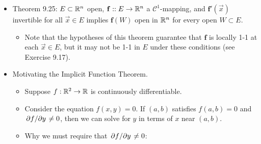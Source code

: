 \documentclass[../notes.tex]{subfiles}
\begin{document}
\begin{itemize}
\begin{enumerate}[label={(\alph*)}]
\begin{proof}
\begin{equation*}
                \frac{|\mathbf{g}(\vec{y}+\vec{k})-\mathbf{g}(\vec{y})-T\vec{k}|}{|\vec{k}|} \leq \frac{\norm{T}|\mathbf{f}(\vec{x}+\vec{h})-\mathbf{f}(\vec{x})-\mathbf{f}'(\vec{x})\vec{h}|}{\lambda|\vec{h}|}
            \end{equation*}
            Consequently, $\vec{k}\to\bm{0}$ implies that $\vec{h}\to\bm{0}$, which implies that the right side of the above inequality goes to zero, which implies that the left side of the above inequality goes to zero. Thus, $\mathbf{g}'(\vec{y})=T$, so
            \begin{equation*}
                \mathbf{g}'(\vec{y}) = [\mathbf{f}'(\mathbf{g}(\vec{y}))]^{-1}
            \end{equation*}
            for all $\vec{y}\in V$, as desired.\par
            To prove that $\mathbf{g}'$ is continuous on $V$, Theorem 4.7 and the above equation tell us that it will suffice to show that $\mathbf{g}:V\to U$ is continuous, $\mathbf{f'}:U\to L(\R^n)$ is continuous, and $M\mapsto M^{-1}:L(\R^n)\to L(\R^n)$ is continuous. But we have the first condition since differentiability implies continuity and $\mathbf{g}$ is differentiable, we have the second condition since $\mathbf{f}\in\mathscr{C}^1$ by hypothesis, and we have the third condition by Theorem 9.8b, as desired.
        \end{proof}
    \end{enumerate}
    \item Theorem 9.25: $E\subset\mathbb{R}^n$ open, $\mathbf{f}::E\to\mathbb{R}^n$ a $\mathscr{C}^1$-mapping, and $\mathbf{f}'(\vec{x})$ invertible for all $\vec{x}\in E$ implies $\mathbf{f}(W)$ open in $\mathbb{R}^n$ for every open $W\subset E$.
    \begin{itemize}
        \item Note that the hypotheses of this theorem guarantee that $\mathbf{f}$ is locally 1-1 at each $\vec{x}\in E$, but it may not be 1-1 in $E$ under these conditions (see Exercise 9.17).
    \end{itemize}
    \item {}Motivating the Implicit Function Theorem.
    \begin{itemize}
        \item Suppose $f:\mathbb{R}^2\to\mathbb{R}$ is continuously differentiable.
        \item Consider the equation $f(x,y)=0$. If $(a,b)$ satisfies $f(a,b)=0$ and $\pdv*{f}{y}\neq 0$, then we can solve for $y$ in terms of $x$ near $(a,b)$.
        \item Why we must require that $\pdv*{f}{y}\neq 0$:

\end{itemize}
\end{itemize}
\end{document}
